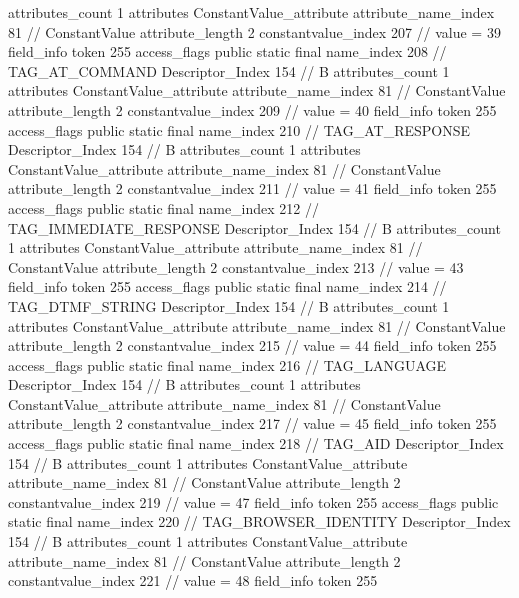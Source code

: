 {{{{{				attributes_count	1
				attributes {
				ConstantValue_attribute {
					attribute_name_index	81		// ConstantValue
					attribute_length	2
					constantvalue_index	207		// value = 39
				}
				}
			}
			field_info {
				token	255
				access_flags	public static final
				name_index	208		// TAG_AT_COMMAND
				Descriptor_Index	154		// B
				attributes_count	1
				attributes {
				ConstantValue_attribute {
					attribute_name_index	81		// ConstantValue
					attribute_length	2
					constantvalue_index	209		// value = 40
				}
				}
			}
			field_info {
				token	255
				access_flags	public static final
				name_index	210		// TAG_AT_RESPONSE
				Descriptor_Index	154		// B
				attributes_count	1
				attributes {
				ConstantValue_attribute {
					attribute_name_index	81		// ConstantValue
					attribute_length	2
					constantvalue_index	211		// value = 41
				}
				}
			}
			field_info {
				token	255
				access_flags	public static final
				name_index	212		// TAG_IMMEDIATE_RESPONSE
				Descriptor_Index	154		// B
				attributes_count	1
				attributes {
				ConstantValue_attribute {
					attribute_name_index	81		// ConstantValue
					attribute_length	2
					constantvalue_index	213		// value = 43
				}
				}
			}
			field_info {
				token	255
				access_flags	public static final
				name_index	214		// TAG_DTMF_STRING
				Descriptor_Index	154		// B
				attributes_count	1
				attributes {
				ConstantValue_attribute {
					attribute_name_index	81		// ConstantValue
					attribute_length	2
					constantvalue_index	215		// value = 44
				}
				}
			}
			field_info {
				token	255
				access_flags	public static final
				name_index	216		// TAG_LANGUAGE
				Descriptor_Index	154		// B
				attributes_count	1
				attributes {
				ConstantValue_attribute {
					attribute_name_index	81		// ConstantValue
					attribute_length	2
					constantvalue_index	217		// value = 45
				}
				}
			}
			field_info {
				token	255
				access_flags	public static final
				name_index	218		// TAG_AID
				Descriptor_Index	154		// B
				attributes_count	1
				attributes {
				ConstantValue_attribute {
					attribute_name_index	81		// ConstantValue
					attribute_length	2
					constantvalue_index	219		// value = 47
				}
				}
			}
			field_info {
				token	255
				access_flags	public static final
				name_index	220		// TAG_BROWSER_IDENTITY
				Descriptor_Index	154		// B
				attributes_count	1
				attributes {
				ConstantValue_attribute {
					attribute_name_index	81		// ConstantValue
					attribute_length	2
					constantvalue_index	221		// value = 48
				}
				}
			}
			field_info {
				token	255
}}}}}
